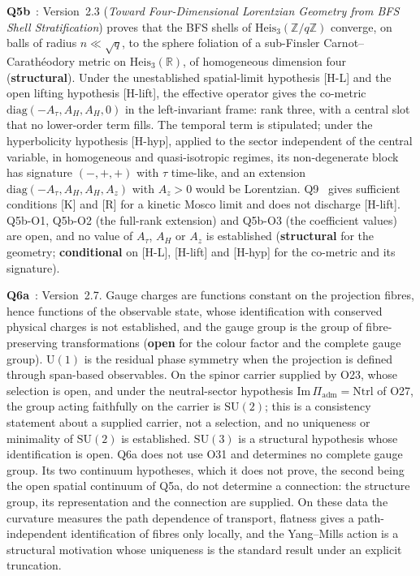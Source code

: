 \documentclass[11pt,a4paper]{article}
\newcommand{\Heis}{\mathrm{Heis}}
\newcommand{\SU}{\mathrm{SU}}
\newcommand{\sstruct}{\textcolor{cstruct}{\textbf{structural}}}
\newcommand{\sopen}{\textcolor{copen}{\textbf{open}}}
\newcommand{\scond}{\textcolor{ccond}{\textbf{conditional}}}
\begin{document}
    \textbf{Q5b}~\cite{Beau2026q5b}: Version~2.3 (\emph{Toward Four-Dimensional Lorentzian Geometry from
    BFS Shell Stratification}) proves that the BFS shells of $\Heis_3(\mathbb{Z}/q\mathbb{Z})$ converge, on
    balls of radius $n \ll \sqrt q$, to the sphere foliation of a sub-Finsler Carnot--Carath\'eodory metric on
    $\Heis_3(\mathbb{R})$, of homogeneous dimension four (\sstruct).
    Under the unestablished spatial-limit hypothesis [H-L] and the open lifting hypothesis [H-lift], the
    effective operator gives the co-metric $\mathrm{diag}(-A_\tau, A_H, A_H, 0)$ in the left-invariant frame:
    rank three, with a central slot that no lower-order term fills.
    The temporal term is stipulated; under the hyperbolicity hypothesis [H-hyp], applied to the sector independent
    of the central variable, in homogeneous and quasi-isotropic regimes, its non-degenerate block has signature
    $(-,+,+)$ with $\tau$ time-like, and an extension
    $\mathrm{diag}(-A_\tau, A_H, A_H, A_z)$ with $A_z > 0$ would be Lorentzian.
    Q9~\cite{Beau2026q9} gives sufficient conditions [K] and [R] for a kinetic Mosco limit and does not
    discharge [H-lift].
    Q5b-O1, Q5b-O2 (the full-rank extension) and Q5b-O3 (the coefficient values) are open, and no value of
    $A_\tau$, $A_H$ or $A_z$ is established
    (\sstruct{} for the geometry; \scond{} on [H-L], [H-lift] and [H-hyp] for the co-metric and its
    signature).

    \textbf{Q6a}~\cite{Beau2026q6a}: Version~2.7. Gauge charges are functions constant on the projection
    fibres, hence functions of the observable state, whose identification with conserved physical charges is
    not established, and the gauge group is the group of fibre-preserving transformations
    (\sopen{} for the colour factor and the complete gauge group).
    $\mathrm{U}(1)$ is the residual phase symmetry when the projection is defined through span-based
    observables.
    On the spinor carrier supplied by O23, whose selection is open, and under the neutral-sector hypothesis
    $\mathrm{Im}\,\Pi_{\mathrm{adm}} = \mathrm{Ntrl}$ of O27, the group acting faithfully on the carrier is
    $\SU(2)$; this is a consistency statement about a supplied carrier, not a selection, and no uniqueness or
    minimality of $\SU(2)$ is established.
    $\SU(3)$ is a structural hypothesis whose identification is open.
    Q6a does not use O31 and determines no complete gauge group.
    Its two continuum hypotheses, which it does not prove, the second being the open spatial continuum of
    Q5a, do not determine a connection: the structure group, its representation and the connection are
    supplied.
    On these data the curvature measures the path dependence of transport, flatness gives a path-independent
    identification of fibres only locally, and the Yang--Mills action is a structural motivation whose
    uniqueness is the standard result under an explicit truncation.
\end{document}
